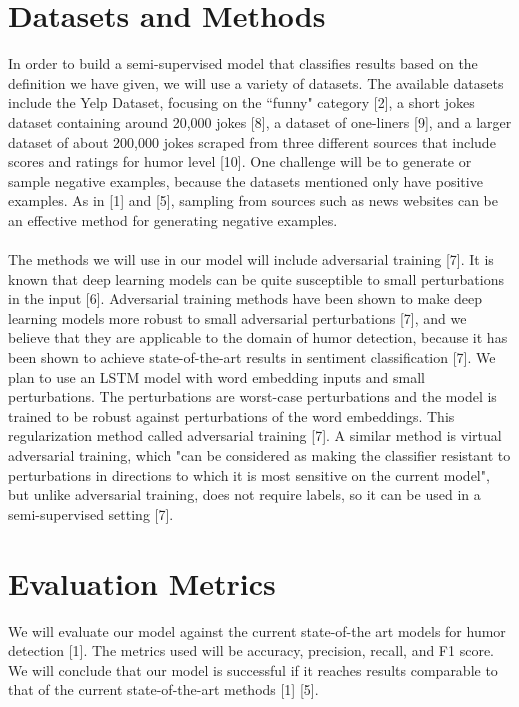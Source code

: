 \documentclass{article}
\begin{document}
\section{Datasets and Methods}
         In order to build a semi-supervised model that classifies results based on the definition we have given, we will use a variety of datasets. 
         The available datasets include the Yelp Dataset, focusing on the ``funny" category [2], a short jokes dataset containing around 20,000 jokes [8], a dataset of one-liners [9], and a larger dataset of about 200,000 jokes scraped from three different sources that include scores and ratings for humor level [10]. One challenge will be to generate or sample negative examples, because the datasets mentioned only have positive examples. As in [1] and [5], sampling from sources such as news websites can be an effective method for generating negative examples.
        \\\\
        The methods we will use in our model will include adversarial training [7]. It is known that deep learning models can be quite susceptible to small perturbations in the input [6]. Adversarial training methods have been shown to make deep learning models more robust to small adversarial perturbations [7], and we believe that they are applicable to the domain of humor detection, because it has been shown to achieve state-of-the-art results in sentiment classification [7]. We plan to use an LSTM model with word embedding inputs and small perturbations. The perturbations are worst-case perturbations and the model is trained to be robust against perturbations of the word embeddings. This regularization method called adversarial training [7]. A similar method is virtual adversarial training, which "can be considered as making the classifier resistant to perturbations in directions to which it is most sensitive on the current model", but unlike adversarial training, does not require labels, so it can be used in a semi-supervised setting [7].

\section{Evaluation Metrics}
We will evaluate our model against the current state-of-the art models for humor detection [1]. The metrics used will be accuracy, precision, recall, and F1 score. We will conclude that our model is successful if it reaches results comparable to that of the current state-of-the-art methods [1] [5].
\pagebreak
\end{document}
